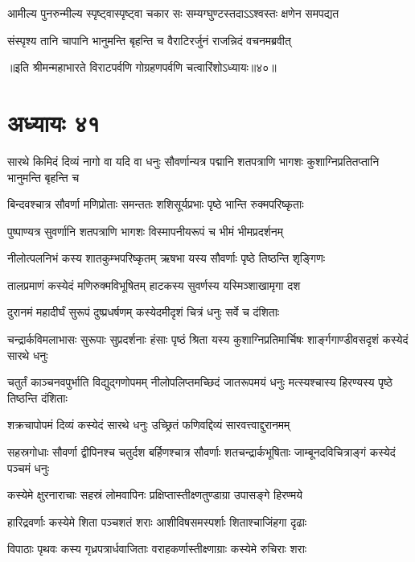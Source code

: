 \twolineshloka
{आमील्य पुनरुन्मील्य स्पृष्ट्वास्पृष्ट्वा चकार सः}
{सम्यग्घुण्टस्तदाऽऽश्वस्तः क्षणेन समपद्यत}


\twolineshloka
{संस्पृश्य तानि चापानि भानुमन्ति बृहन्ति च}
{वैराटिरर्जुनं राजन्निदं वचनमब्रवीत्}

॥इति श्रीमन्महाभारते विराटपर्वणि गोग्रहणपर्वणि चत्वारिंशोऽध्यायः॥४०॥

\chapter{अध्यायः ४१}

\threelineshloka
{सारथे किमिदं दिव्यं नागो वा यदि वा धनुः}
{सौवर्णान्यत्र पद्मानि शतपत्राणि भागशः}
{कुशाग्निप्रतितप्तानि भानुमन्ति बृहन्ति च}


\twolineshloka
{बिन्दवश्चात्र सौवर्णा मणिप्रोताः समन्ततः}
{शशिसूर्यप्रभाः पृष्ठे भान्ति रुक्मपरिष्कृताः}


\twolineshloka
{पुष्पाण्यत्र सुवर्णानि शतपत्राणि भागशः}
{विस्मापनीयरूपं च भीमं भीमप्रदर्शनम्}


\twolineshloka
{नीलोत्पलनिभं कस्य शातकुम्भपरिष्कृतम्}
{ऋषभा यस्य सौवर्णाः पृष्ठे तिष्ठन्ति शृङ्गिणः}


\twolineshloka
{तालप्रमाणं कस्येदं मणिरुक्मविभूषितम्}
{हाटकस्य सुवर्णस्य यस्मिञ्शाखामृगा दश}

\twolineshloka
{दुरानमं महादीर्घं सुरूपं दुष्प्रधर्षणम्}
{कस्येदमीदृशं चित्रं धनुः सर्वे च दंशिताः}


\threelineshloka
{चन्द्रार्कविमलाभासः सुरूपाः सुप्रदर्शनाः}
{हंसाः पृष्ठं श्रिता यस्य कुशाग्निप्रतिमार्चिषः}
{शार्ङ्गगाण्डीवसदृशं कस्येदं सारथे धनुः}


\threelineshloka
{चतुर्तं काञ्चनवपुर्भाति विद्युद्गणोपमम्}
{नीलोपलिप्तमच्छिदं जातरूपमयं धनुः}
{मत्स्यश्चास्य हिरण्यस्य पृष्ठे तिष्ठन्ति दंशिताः}


\twolineshloka
{शक्रचापोपमं दिव्यं कस्येदं सारथे धनुः}
{उच्छ्रितं फणिवद्दिव्यं सारवत्त्वाद्दुरानमम्}


\threelineshloka
{सहस्रगोधाः सौवर्णा द्वीपिनश्च चतुर्दश}
{बर्हिणश्चात्र सौवर्णाः शतचन्द्रार्कभूषिताः}
{जाम्बूनदविचित्राङ्गं कस्येदं पञ्चमं धनुः}


\twolineshloka
{कस्येमे क्षुरनाराचाः सहस्रं लोमवापिनः}
{प्रक्षिप्तास्तीक्ष्णतुण्डाग्रा उपासङ्गे हिरण्मये}


\twolineshloka
{हारिद्रवर्णाः कस्येमे शिता पञ्चशतं शराः}
{आशीविषसमस्पर्शाः शिताश्चाजिंहगा दृढाः}


\twolineshloka
{विपाठाः पृथवः कस्य गृध्रपत्रार्धवाजिताः}
{वराहकर्णास्तीक्ष्णाग्राः कस्येमे रुचिराः शराः}


